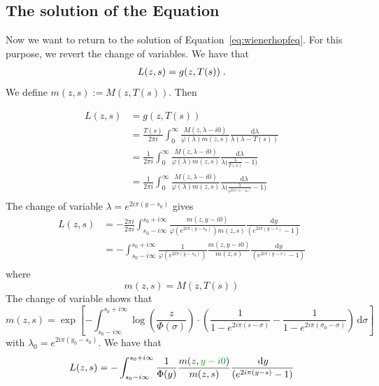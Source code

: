 \documentclass[11pt]{amsart}
\newcommand{\MD}{\color{vert}}
\newcommand{\diff}{\,\mathrm{d}}
\begin{document}
\subsection{The solution of the Equation}
Now we want to return to the solution of Equation~\eqref{eq:wienerhopfeq}. For this purpose, we revert the change of variables. We have that 
\begin{align}
    L(z,s) = g(z, T(s)) 
    \; .
\end{align}
We define $m(z,s) := M(z, T(s))$. Then

\begin{align*}
    L(z,s) &= g(z,T(s)) \\ 
    &= 
    \frac{T(s)}{2\pi i}\int_0^\infty  \frac{M(z,\lambda-i0)}{\varphi(\lambda)m(z,s)} \frac{\diff \lambda}{\lambda(\lambda-T(s))} \\
    &= 
    \frac{1}{2\pi i}\int_0^\infty  \frac{M(z,\lambda-i0)}{\varphi(\lambda)m(z,s)} \frac{\diff \lambda}{\lambda\Big(\frac{\lambda}{T(s)}-1\Big)} \\
    &= 
    \frac{1}{2\pi i}\int_0^\infty  \frac{M(z,\lambda-i0)}{\varphi(\lambda)m(z,s)} \frac{\diff \lambda}{\lambda\Big(\frac{\lambda}{e^{2i\pi(s-s_0)}}-1\Big)} \\
\end{align*}
The change of variable $\lambda = e^{2i\pi(y-s_0)}$ gives
\begin{align*}
    L(z,s)
    &= 
    - \frac{2\pi i}{2\pi i}\int_{s_0-i\infty}^{s_0+i\infty}  \frac{m(z,y-i0)}{\varphi(e^{2i\pi(y-s_0)})m(z,s)} \frac{\diff y}{(e^{2i\pi(y-s)}-1)} \\
    &= 
   - \int_{s_0-i\infty}^{s_0+i\infty} \frac{1}{\varphi(e^{2i\pi(y-s_0)})}  \frac{m(z,y-i0)}{m(z,s)} \frac{\diff y}{(e^{2i\pi(y-s)}-1)} \\
\end{align*}
where 
$$m(z,s) = M(z, T(s))$$
The change of variable shows that
\begin{equation}
    m(z,s) = \exp \left[
    - \int_{s_0-i\infty}^{s_0+i\infty}\log \left( \frac{z}{\Phi(
    \sigma)}\right)
    \cdot \left(
        \frac{1}{1-e^{2i\pi(s-\sigma)}} - \frac{1}{1-e^{2i\pi(\sigma_0-\sigma)}}
     \right) \diff \sigma
    \right]
\end{equation} 
with $\lambda_0 = e^{2i\pi(y_0 - s_0)}$. 
We have that 
\begin{equation}
    L(z,s) 
    = 
   - \int_{s_0-i\infty}^{s_0+i\infty} \frac{1}{\Phi(y)}  \frac{m(z,{\MD y-i0})}{m(z,s)} \frac{\diff y}{(e^{2i\pi(y-s)}-1)}
\end{equation}
\end{document}
